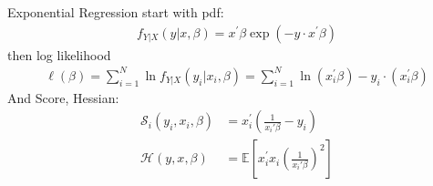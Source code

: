 \documentclass[aspectratio=169]{beamer}
\begin{document}
\begin{frame}{Exponential Regression}
start with pdf:
\begin{align*}
f _ { Y | X } ( y | x , \beta  ) =   x ^ { \prime } \beta   \exp \left( - y\cdot x ^ { \prime } \beta   \right)
\end{align*}
then log likelihood
\begin{align*}
\ell( \beta ) = \sum _ { i = 1 } ^ { N } \ln f _ { Y | X } \left( y _ { i } | x _ { i } , \beta \right) 
= \sum _ { i = 1 } ^ { N } \ln( x _ { i } ^ { \prime } \beta )- y _ { i } \cdot \left( x _ { i } ^ { \prime } \beta \right)
\end{align*}
And Score, Hessian:
\begin{align*}
\mathcal { S }_i ( y_i, x_i , \beta ) &= x_i ^ { \prime } \left( \frac{1}{x_i' \beta} - y_i  \right)\\
\mathcal { H } ( y , x , \beta ) &=  \mathbb{E} \left[  x_i ^ { \prime } x_i  \left( \frac{1}{x_i' \beta}\right)^2 \right]\\
\end{align*}
\end{frame}
%
\end{document}
